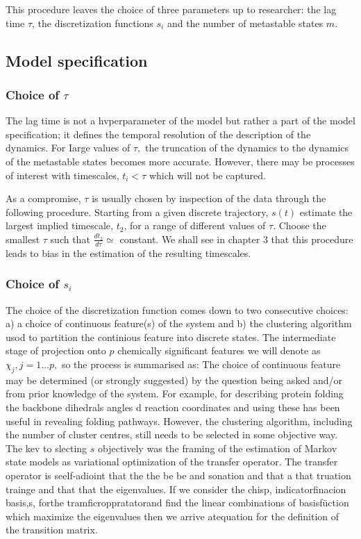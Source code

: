 This procedure leaves the choice of three parameters up to researcher: the lag time $\tau$, the discretization functions $s_{i}$ and the number of metastable states $m$.

\subsection{Model specification}
\subsubsection{Choice of $\tau$}
 The lag time is not a hvperparameter of the model but rather a part of the model specification; it defines the temporal resolution of the description of the dynamics. For
Iarge values of $\tau,$ the truncation of the dynamics to the dynamics of the metastable states becomes more accurate. However, there may be processes of interest with timescales, $t_{i}<\tau$ which will not be captured.

As a compromise, $\tau$ is usually chosen by inspection of the data through the following procedure. Starting from a given discrete trajectory, $s(t)$ estimate the largest implied timescale, $t_{2}$, for a range of different values of $\tau$. Choose the smallest $\tau$ such that $\frac{d t_{2}}{d \tau} \simeq$ constant. We shall see in chapter 3 that this procedure leads to bias in
the estimation of the resulting timescales.

\subsubsection{Choice of $s_i$}
The choice of the discretization function comes down to two consecutive choices: a) a choice of continuous feature(s) of the system and b) the clustering algorithm usod to partition the continious feature into discrete states. The intermediate stage of projection onto $p$ chemically significant features we will denote as $\chi_{j}, j=1 \ldots p,$ so the process is summarised as:
The choice of continuous feature may be determined (or strongly suggested) by the question being asked and/or from prior knowledge of the system. For example, for describing protein folding the backbone dihedrals angles d reaction coordinates and using these has been useful in revealing folding pathways. However, the clustering algorithm, including the number of cluster centres, still needs to be selected in some objective way. The kev to slecting $s$ objectively was the framing of the estimation of Markov state models as variational optimization of the transfer operator. The transfer operator is seelf-adioint that the the be be and sonation and that a that truation trainge and that that the eigenvalues. If we consider the chisp, indicatorfinacion basis,s, forthe tramficroppratatorand find the linear combinations of basisfüction which maximize the eigenvalues then we arrive atequation for the definition of the transition matrix.

